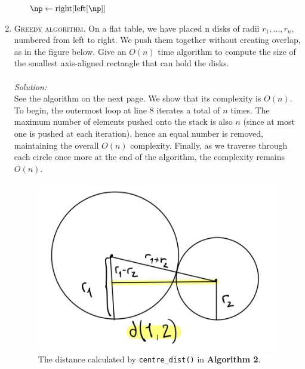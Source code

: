 \documentclass[12pt]{article}
\theoremstyle{definition}
\theoremstyle{remark}
\newcommand\sol{%
  \\ 
  \\
  \textit{Solution:}\\%
}
\begin{document}
\begin{enumerate}
\begin{enumerate}
\begin{algorithm}
    \BlankLine
    $\np \gets \text{right}[\text{left}[\np]]$ 
    
    
    
\end{algorithm}
\end{enumerate}
  \newpage 
  \item \textsc{Greedy algorithm}. On a flat table, we have placed n disks of radii $r_1, ..., r_n$, numbered from left to right. We push them together without creating overlap, as in the figure below. Give an $O(n)$ time algorithm to compute the size of the smallest axis-aligned rectangle that can hold the disks.
  \sol 
  See the algorithm on the next page. We show that its complexity is $O(n)$. To begin, the outermost loop at line 8 iterates a total of $n$ times. The maximum number of elements pushed onto the stack is also $n$ (since at most one is pushed at each iteration), hence an equal number is removed, maintaining the overall $O(n)$ complexity. Finally, as we traverse through each circle once more at the end of the algorithm, the complexity remains $O(n)$.
\begin{figure}[htb!]
     \centering
     \includegraphics[scale=0.20]{A4-252.jpg}
     \caption{The distance calculated by \texttt{centre\_dist()} in \textbf{Algorithm 2}.} 
\end{figure}


\end{enumerate}
\end{document}
